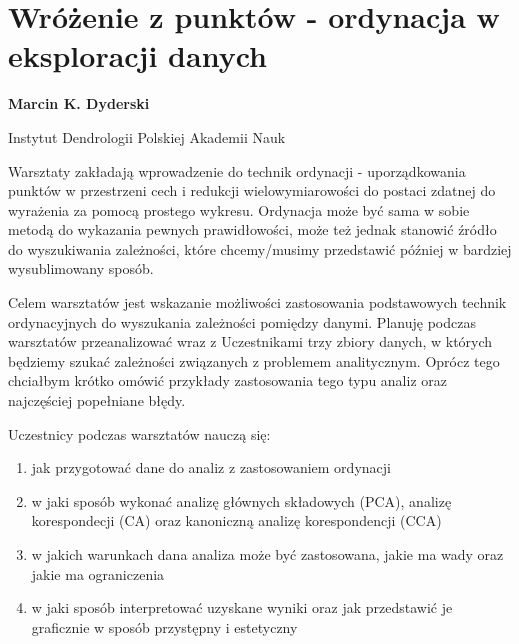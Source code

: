 \documentclass[\main/boa.tex]{subfiles}
\begin{document}
\section{Wróżenie z punktów - ordynacja w eksploracji danych}

\begin{minipage}{0.915\textwidth}
\centering
{\bf {} Marcin K. Dyderski}
\end{minipage}

\vskip 0.3cm

\begin{affiliations}
\begin{minipage}{0.915\textwidth}
\centering
\large Instytut Dendrologii Polskiej Akademii Nauk  \\[2pt]
\end{minipage}
\end{affiliations}

\vskip 0.8cm

\opiswarsztatu Warsztaty zakładają wprowadzenie do technik ordynacji - uporządkowania punktów w przestrzeni cech i redukcji wielowymiarowości do postaci zdatnej do wyrażenia za pomocą prostego wykresu. Ordynacja może być sama w sobie metodą do wykazania pewnych prawidłowości, może też jednak stanowić źródło do wyszukiwania zależności, które chcemy/musimy przedstawić później w bardziej wysublimowany sposób.

Celem warsztatów jest wskazanie możliwości zastosowania podstawowych technik ordynacyjnych do wyszukania zależności pomiędzy danymi. Planuję podczas warsztatów przeanalizować wraz z Uczestnikami trzy zbiory danych, w których będziemy szukać zależności związanych z problemem analitycznym. Oprócz tego chciałbym krótko omówić przykłady zastosowania tego typu analiz oraz najczęściej popełniane błędy.

Uczestnicy podczas warsztatów nauczą się:
\begin{enumerate}
\item jak przygotować dane do analiz z zastosowaniem ordynacji
\item w jaki sposób wykonać analizę głównych składowych (PCA), analizę korespondecji (CA) oraz kanoniczną analizę korespondencji (CCA)
\item w jakich warunkach dana analiza może być zastosowana, jakie ma wady oraz jakie ma ograniczenia
\item w jaki sposób interpretować uzyskane wyniki oraz jak przedstawić je graficznie w sposób przystępny i estetyczny
\end{enumerate}
\end{document}
